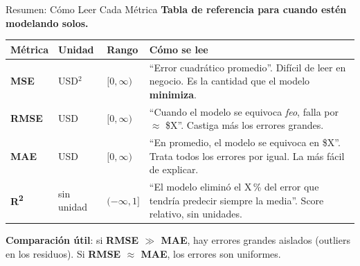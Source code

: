 \documentclass[aspectratio=169, 11pt]{beamer}
\begin{document}
\begin{frame}[shrink=8]{Resumen: Cómo Leer Cada Métrica}
  \vspace{-4pt}
  {\footnotesize\color{arcaDark}\bfseries
    Tabla de referencia para cuando estén modelando solos.}

  \vspace{6pt}
  {\scriptsize
  \begin{tabular}{@{}lllp{6.4cm}@{}}
    \toprule
    \textbf{Métrica} & \textbf{Unidad} & \textbf{Rango} & \textbf{Cómo se lee} \\
    \midrule
    \textbf{MSE} & USD$^2$ & $[0, \infty)$ &
      ``Error cuadrático promedio''. Difícil de leer en negocio.
      Es la cantidad que el modelo \textbf{minimiza}. \\[3pt]
    \textbf{RMSE} & USD & $[0, \infty)$ &
      ``Cuando el modelo se equivoca \textit{feo}, falla por
      $\approx$ \$X''. Castiga más los errores grandes. \\[3pt]
    \textbf{MAE} & USD & $[0, \infty)$ &
      ``En promedio, el modelo se equivoca en \$X''. Trata todos
      los errores por igual. La más fácil de explicar. \\[3pt]
    \textbf{R\textsuperscript{2}} & sin unidad & $(-\infty, 1]$ &
      ``El modelo eliminó el X\,\% del error que tendría predecir
      siempre la media''. Score relativo, sin unidades. \\
    \bottomrule
  \end{tabular}
  }

  \vspace{8pt}
  {\footnotesize\color{arcaDark}
    \faLightbulb\hspace{4pt}
    \textbf{Comparación útil}: si \textbf{RMSE $\gg$ MAE}, hay errores grandes
    aislados (outliers en los residuos). Si \textbf{RMSE $\approx$ MAE}, los
    errores son uniformes.}
\end{frame}
\end{document}
